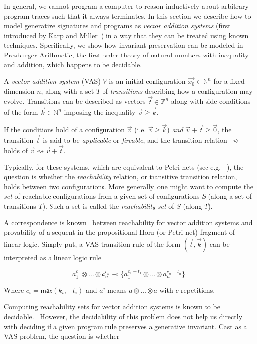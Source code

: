 \documentclass[fullpage, 11pt]{article}
\newcommand{\lolli}{\multimap}
\newcommand{\tensor}{\otimes}
\newcommand{\mon}[1]{\{#1\}}
\newcommand{\stepsto}{\rightsquigarrow}
\begin{document}
In general, we cannot program a computer to reason inductively about
arbitrary program traces such that it always terminates. In this section we
describe how to model generative signatures and programs as {\em vector
addition systems} (first introduced by Karp and
    Miller~\cite{karp1969parallel})
in a way that they can be treated using known
techniques. Specifically, we show how invariant preservation can be modeled
in Presburger Arithmetic, the first-order theory of natural numbers with
inequality and addition, which happens to be decidable.


A {\em vector addition system} (VAS) $V$ is an initial
configuration $\vec{x_0} \in \mathbb{N}^n$ for a fixed dimension $n$,
along with a set $T$ of {\em transitions} describing how a configuration
may evolve. Transitions can be described as vectors $\vec{t} \in \mathbb{Z}^n$
along with side conditions of the form $\vec{k} \in \mathbb{N}^n$ imposing
the inequality $\vec{v} \geq \vec{k}$.

If the conditions hold of a configuration $\vec{v}$ (i.e. $\vec{v} \geq
\vec{k}$) {\em and} $\vec{v} + \vec{t} \geq \vec{0}$, the transition
$\vec{t}$ is said to be {\em applicable} or {\em fireable}, and the
transition relation $\stepsto$ holds of $\vec{v} \stepsto \vec{v}+\vec{t}$.

Typically, for these systems, which are equivalent to Petri nets (see e.g.
~\cite{Leroux2010VASReach}), the question is whether the {\em reachability}
relation, or transitive transition relation, holds between two
configurations. More generally, one might want to compute the {\em set} of
reachable configurations from a given set of configurations $S$ (along a
set of transitions $T$). Such a set is called the {\em reachability set} of
$S$ (along $T$). 

A correspondence is known~\cite{Kanovich1995petri} between reachability for
vector addition systems and provability of a sequent in the propositional
Horn (or Petri net) fragment of linear logic. Simply put, a VAS transition
rule of the form $(\vec{t}, \vec{k})$
can be interpreted as a linear logic rule

\[
a_1^{c_1} \tensor \dots \tensor a_n^{c_n} \lolli
  \mon{a_1^{c_1+t_1}\tensor \dots \tensor a_n^{c_n+t_n} }
\]

Where $c_i = \mathsf{max}(k_i, -t_i)$ and $a^c$ means $a\tensor \dots
\tensor a$ with $c$ repetitions.

Computing reachability sets for vector addition systems is known to be
decidable.~\cite{SacerdoteTenney1977} 
However, the decidability of this problem does not help us directly with
deciding if a given program rule preserves a generative invariant. Cast as
a VAS problem, the question is whether
\end{document}
